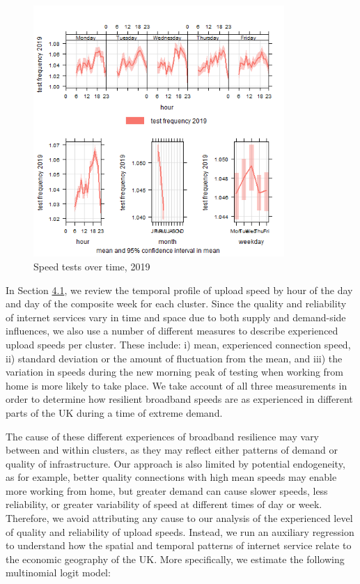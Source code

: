 \documentclass[]{interact}
\theoremstyle{plain}%
\theoremstyle{definition}
\theoremstyle{remark}
\begin{document}
\begin{figure}
\centering
\includegraphics[width=0.85\textwidth,height=0.5\textheight]{figures/time.var.plot2019.png}
\caption{Speed tests over time, 2019 \label{test2019}}
\end{figure}

In Section \protect\hyperlink{sec:4.1}{4.1}, we review the temporal
profile of upload speed by hour of the day and day of the composite week
for each cluster. Since the quality and reliability of internet services
vary in time and space due to both supply and demand-side influences, we
also use a number of different measures to describe experienced upload
speeds per cluster. These include: i) mean, experienced connection
speed, ii) standard deviation or the amount of fluctuation from the
mean, and iii) the variation in speeds during the new morning peak of
testing when working from home is more likely to take place. We take
account of all three measurements in order to determine how resilient
broadband speeds are as experienced in different parts of the UK during
a time of extreme demand.

The cause of these different experiences of broadband resilience may
vary between and within clusters, as they may reflect either patterns of
demand or quality of infrastructure. Our approach is also limited by
potential endogeneity, as for example, better quality connections with
high mean speeds may enable more working from home, but greater demand
can cause slower speeds, less reliability, or greater variability of
speed at different times of day or week. Therefore, we avoid attributing
any cause to our analysis of the experienced level of quality and
reliability of upload speeds. Instead, we run an auxiliary regression to
understand how the spatial and temporal patterns of internet service
relate to the economic geography of the UK. More specifically, we
estimate the following multinomial logit model:
\end{document}
